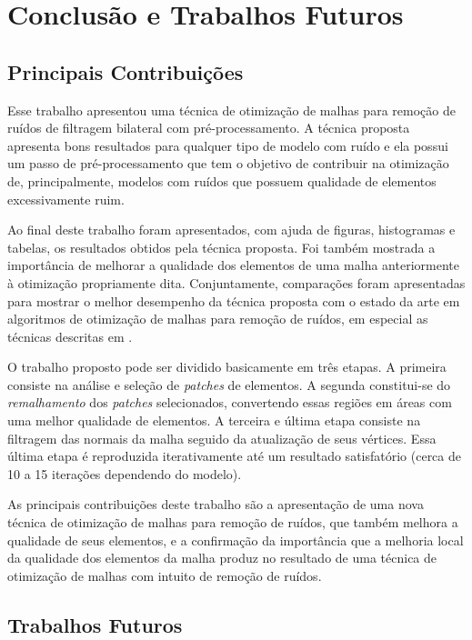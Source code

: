 \chapter{Conclusão e Trabalhos Futuros}
\label{chap:conclusao-e-trabalhos-futuros}

\section{Principais Contribuições} 
Esse trabalho apresentou uma técnica de otimização de malhas para remoção de ruídos de filtragem bilateral com pré-processamento. A técnica proposta apresenta bons resultados para qualquer tipo de modelo com ruído e ela possui um passo de pré-processamento que tem o objetivo de contribuir na otimização de, principalmente, modelos com ruídos que possuem qualidade de elementos excessivamente ruim.

Ao final deste trabalho foram apresentados, com ajuda de figuras, histogramas e tabelas, os resultados obtidos pela técnica proposta. Foi também mostrada a importância de melhorar a qualidade dos elementos de uma malha anteriormente à otimização propriamente dita. Conjuntamente, comparações foram apresentadas para mostrar o melhor desempenho da técnica proposta com o estado da arte em algoritmos de otimização de malhas para remoção de ruídos, em especial as técnicas descritas em \cite{zhang2015guided, sun2007fast, zheng2011bilateral}.

O trabalho proposto pode ser dividido basicamente em três etapas. A primeira consiste na análise e seleção de \textit{patches} de elementos. A segunda constitui-se do \textit{remalhamento} dos \textit{patches} selecionados, convertendo essas regiões em áreas com uma melhor qualidade de elementos. A terceira e última etapa consiste na filtragem das normais da malha seguido da atualização de seus vértices. Essa última etapa é reproduzida iterativamente até um resultado satisfatório (cerca de 10 a 15 iterações dependendo do modelo).

As principais contribuições deste trabalho são a apresentação de uma nova técnica de otimização de malhas para remoção de ruídos, que também melhora a qualidade de seus elementos, e a confirmação da importância que a melhoria local da qualidade dos elementos da malha produz no resultado de uma técnica de otimização de malhas com intuito de remoção de ruídos.

\section{Trabalhos Futuros}

